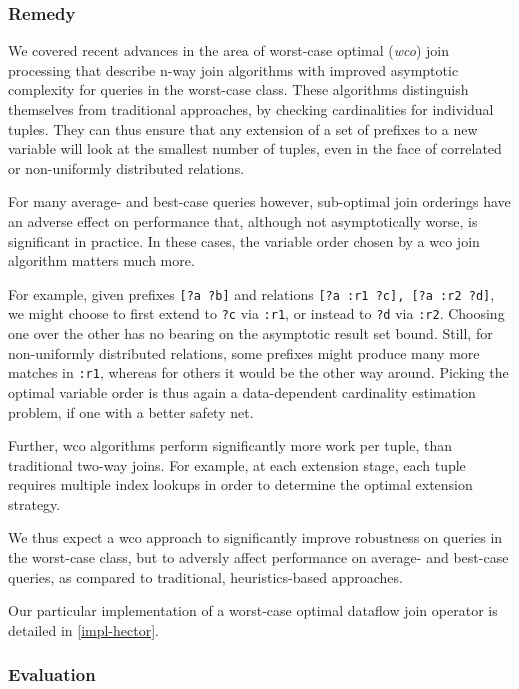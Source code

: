 \documentclass[../catalog.tex]{subfiles}
\begin{document}
\subsubsection{Remedy}

We covered recent advances in the area of worst-case optimal
(\emph{wco}) join processing that describe n-way join algorithms with
improved asymptotic complexity for queries in the worst-case
class. These algorithms distinguish themselves from traditional
approaches, by checking cardinalities for individual tuples. They can
thus ensure that any extension of a set of prefixes to a new variable
will look at the smallest number of tuples, even in the face of
correlated or non-uniformly distributed relations.

For many average- and best-case queries however, sub-optimal join
orderings have an adverse effect on performance that, although not
asymptotically worse, is significant in practice. In these cases, the
variable order chosen by a wco join algorithm matters much more.

For example, given prefixes \texttt{[?a ?b]} and relations \texttt{[?a
    :r1 ?c], [?a :r2 ?d]}, we might choose to first extend to
\texttt{?c} via \texttt{:r1}, or instead to \texttt{?d} via
\texttt{:r2}. Choosing one over the other has no bearing on the
asymptotic result set bound. Still, for non-uniformly distributed
relations, some prefixes might produce many more matches in
\texttt{:r1}, whereas for others it would be the other way
around. Picking the optimal variable order is thus again a
data-dependent cardinality estimation problem, if one with a better
safety net.

Further, wco algorithms perform significantly more work per tuple,
than traditional two-way joins. For example, at each extension stage,
each tuple requires multiple index lookups in order to determine the
optimal extension strategy.

We thus expect a wco approach to significantly improve robustness on
queries in the worst-case class, but to adversly affect performance on
average- and best-case queries, as compared to traditional,
heuristics-based approaches.

Our particular implementation of a worst-case optimal dataflow join
operator is detailed in \autoref{impl-hector}.

\subsubsection{Evaluation}
\end{document}
